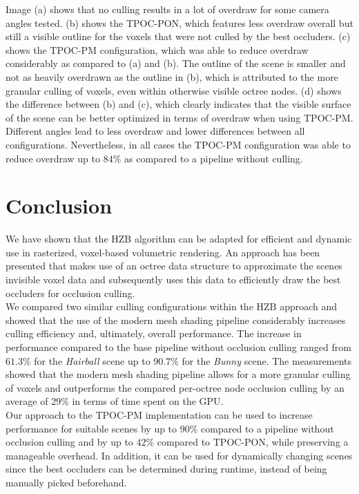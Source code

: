 \documentclass[conference]{IEEEtran}
\begin{document}
\noindent
Image (a) shows that no culling results in a lot of overdraw for some camera angles tested. (b) shows 
the \ac{TPOC-PON}, which features less overdraw overall but still a visible outline 
for the voxels that were not culled by the best occluders. (c) shows the \ac{TPOC-PM} 
configuration, which was able to reduce overdraw considerably as compared to (a) and (b). The outline 
of the scene is smaller and not as heavily overdrawn as the outline in (b), which is attributed to the 
more granular culling of voxels, even within otherwise visible octree nodes. (d) shows the difference 
between (b) and (c), which clearly indicates that the visible surface of the scene can be better 
optimized in terms of overdraw when using \ac{TPOC-PM}. \\

\noindent
Different angles lead to less overdraw and lower differences between all configurations. Nevertheless, 
in all cases the \ac{TPOC-PM} configuration was able to reduce overdraw up to $84 \%$ as compared to 
a pipeline without culling.

\section{Conclusion} \label{sec-conclusion}

\noindent
We have shown that the \ac{HZB} algorithm can be adapted for efficient and dynamic use in rasterized, voxel-based 
volumetric rendering. An approach has been presented that makes use of an octree data structure to approximate 
the scenes invisible voxel data and subsequently uses this data to efficiently draw the best occluders for occlusion 
culling. \\

\noindent
We compared two similar culling configurations within the \ac{HZB} approach and showed that the use of the 
modern mesh shading pipeline considerably increases culling efficiency and, ultimately, overall performance.
The increase in performance compared to the base pipeline without occlusion culling ranged from $61.3 \%$ for 
the \emph{Hairball} scene up to $90.7 \%$ for the \emph{Bunny} scene. The measurements showed that the modern 
mesh shading pipeline allows for a more granular culling of voxels and outperforms the compared per-octree 
node occlusion culling by an average of $29 \%$ in terms of time spent on the \ac{GPU}. \\

\noindent 
Our approach to the \ac{TPOC-PM} implementation can be used to increase performance for suitable scenes by up 
to $90\%$ compared to a pipeline without occlusion culling and by up to $42\%$ compared to \ac{TPOC-PON}, while 
preserving a manageable overhead. In addition, it can be used for dynamically changing scenes since the best 
occluders can be determined during runtime, instead of being manually picked beforehand. \\
\end{document}

